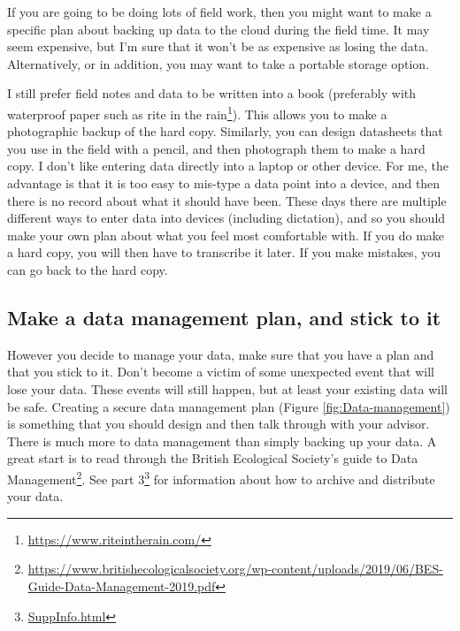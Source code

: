 \documentclass[
]{krantz}
\renewcommand{\href}[2]{#2\footnote{\url{#1}}}
\begin{document}
If you are going to be doing lots of field work, then you might want to make a specific plan about backing up data to the cloud during the field time. It may seem expensive, but I'm sure that it won't be as expensive as losing the data. Alternatively, or in addition, you may want to take a portable storage option.

I still prefer field notes and data to be written into a book (preferably with waterproof paper such as \href{https://www.riteintherain.com/}{rite in the rain}). This allows you to make a photographic backup of the hard copy. Similarly, you can design datasheets that you use in the field with a pencil, and then photograph them to make a hard copy. I don't like entering data directly into a laptop or other device. For me, the advantage is that it is too easy to mis-type a data point into a device, and then there is no record about what it should have been. These days there are multiple different ways to enter data into devices (including dictation), and so you should make your own plan about what you feel most comfortable with. If you do make a hard copy, you will then have to transcribe it later. If you make mistakes, you can go back to the hard copy.

\hypertarget{make-a-data-management-plan-and-stick-to-it}{%
\subsection{Make a data management plan, and stick to it}\label{make-a-data-management-plan-and-stick-to-it}}

However you decide to manage your data, make sure that you have a plan and that you stick to it. Don't become a victim of some unexpected event that will lose your data. These events will still happen, but at least your existing data will be safe. Creating a secure data management plan (Figure \ref{fig:Data-management}) is something that you should design and then talk through with your advisor. There is much more to data management than simply backing up your data. A great start is to read through the \href{https://www.britishecologicalsociety.org/wp-content/uploads/2019/06/BES-Guide-Data-Management-2019.pdf}{British Ecological Society's guide to Data Management}. \href{SuppInfo.html}{See part 3} for information about how to archive and distribute your data.
\end{document}
